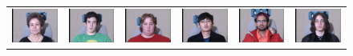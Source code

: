 \documentclass[10pt,journal,letterpaper,compsoc]{IEEEtran} %
\begin{document}
\begin{figure}
{\begin{tabular}{@{}c@{}c@{}c@{}c@{}c@{}c@{}}
\hspace{-2mm}\includegraphics[width=\tempwidth,clip=true]{figures_pami/multipie_failed/079_02_01_051_08.png}  &
\includegraphics[width=\tempwidth,clip=true]{figures_pami/multipie_failed/111_02_01_051_08.png}  &
\includegraphics[width=\tempwidth,clip=true]{figures_pami/multipie_failed/196_02_01_051_08.png}  &
\includegraphics[width=\tempwidth,clip=true]{figures_pami/multipie_failed/130_02_01_051_08.png}  &
\includegraphics[width=\tempwidth,clip=true]{figures_pami/multipie_failed/163_02_01_051_08.png}  &
\includegraphics[width=\tempwidth,clip=true]{figures_pami/multipie_failed/175_02_01_051_08.png} \\

\end{tabular}}
\end{figure}
\end{document}
